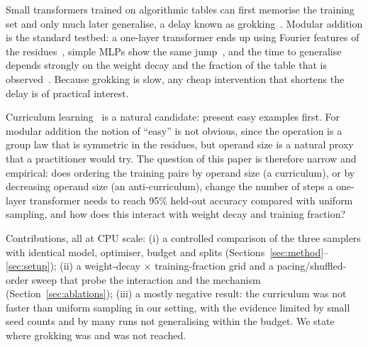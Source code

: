 Small transformers trained on algorithmic tables can first memorise the training set and only much later generalise, a delay known as grokking~\cite{power2022grokking}. Modular addition is the standard testbed: a one-layer transformer ends up using Fourier features of the residues~\cite{nanda2023progress}, simple MLPs show the same jump~\cite{gromov2023grokking}, and the time to generalise depends strongly on the weight decay and the fraction of the table that is observed~\cite{power2022grokking,liu2022understanding}. Because grokking is slow, any cheap intervention that shortens the delay is of practical interest.

Curriculum learning~\cite{bengio2009curriculum,wang2020survey} is a natural candidate: present easy examples first. For modular addition the notion of ``easy'' is not obvious, since the operation is a group law that is symmetric in the residues, but operand size is a natural proxy that a practitioner would try. The question of this paper is therefore narrow and empirical: does ordering the training pairs by operand size (a curriculum), or by decreasing operand size (an anti-curriculum), change the number of steps a one-layer transformer needs to reach 95\% held-out accuracy compared with uniform sampling, and how does this interact with weight decay and training fraction?

Contributions, all at CPU scale: (i) a controlled comparison of the three samplers with identical model, optimiser, budget and splits (Sections~\ref{sec:method}--\ref{sec:setup}); (ii) a weight-decay $\times$ training-fraction grid and a pacing/shuffled-order sweep that probe the interaction and the mechanism (Section~\ref{sec:ablations}); (iii) a mostly negative result: the curriculum was not faster than uniform sampling in our setting, with the evidence limited by small seed counts and by many runs not generalising within the budget. We state where grokking was and was not reached.
